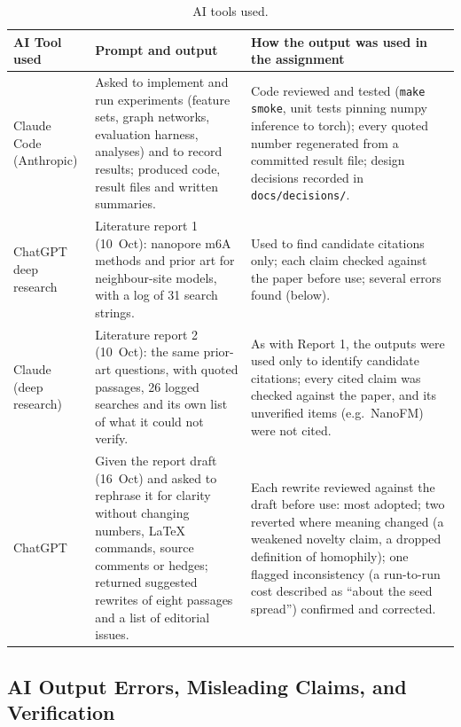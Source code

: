 \documentclass[11pt,a4paper]{article}
\begin{document}
\begin{table}[H]
    \centering\small
    \begin{tabularx}{\linewidth}{>{\raggedright\arraybackslash}p{2.3cm}YY}
        \toprule
        \textbf{AI Tool used} & \textbf{Prompt and output} & \textbf{How the output was used in the assignment} \\
        \midrule
        Claude Code (Anthropic) & Asked to implement and run experiments (feature sets, graph networks, evaluation harness, analyses) and to record results; produced code, result files and written summaries. & Code reviewed and tested (\texttt{make smoke}, unit tests pinning numpy inference to torch); every quoted number regenerated from a committed result file; design decisions recorded in \texttt{docs/decisions/}. \\
        ChatGPT deep research & Literature report 1 (10~Oct): nanopore m6A methods and prior art for neighbour-site models, with a log of 31 search strings. & Used to find candidate citations only; each claim checked against the paper before use; several errors found (below). \\
        Claude (deep research) & Literature report 2 (10~Oct): the same prior-art questions, with quoted passages, 26 logged searches and its own list of what it could not verify. & As with Report 1, the outputs were used only to identify candidate citations; every cited claim was checked against the paper, and its unverified items (e.g.\ NanoFM) were not cited. \\
        ChatGPT & Given the report draft (16~Oct) and asked to rephrase it for clarity without changing numbers, LaTeX commands, source comments or hedges; returned suggested rewrites of eight passages and a list of editorial issues. & Each rewrite reviewed against the draft before use: most adopted; two reverted where meaning changed (a weakened novelty claim, a dropped definition of homophily); one flagged inconsistency (a run-to-run cost described as ``about the seed spread'') confirmed and corrected. \\        \bottomrule
    \end{tabularx}
    \caption{AI tools used.}
    \label{tab:ai_usage}
\end{table}

\subsection*{AI Output Errors, Misleading Claims, and Verification}
\end{document}
